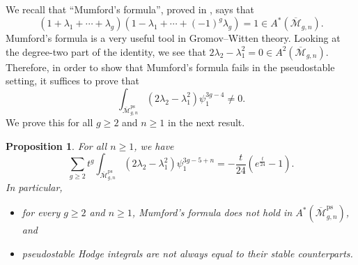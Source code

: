 \documentclass[12pt]{amsart}
\newtheorem{proposition}[equation]{Proposition}
\theoremstyle{definition}
\newcommand{\M}{\overline{\mathcal{M}}}
\newcommand{\ps}{\mathrm{ps}}
\numberwithin{equation}{section}
\begin{document}
We recall that ``Mumford's formula'', proved in \cite{Mumford}, says that
\[
(1+\lambda_1+\cdots+\lambda_g)(1-\lambda_1+\cdots+(-1)^g\lambda_g)=1\in A^*(\M_{g,n}).
\]
Mumford's formula is a very useful tool in Gromov--Witten theory. Looking at the degree-two part of the identity, we see that $2\lambda_2-\lambda_1^2=0\in A^2(\M_{g,n})$. Therefore, in order to show that Mumford's formula fails in the pseudostable setting, it suffices to prove that
\[
\int_{\M_{g,n}^{\ps}}(2\lambda_2-\lambda_1^2)\psi_1^{3g-4}\neq 0.
\]
We prove this for all $g\geq 2$ and $n\geq 1$ in the next result.

\begin{proposition}\label{thm:mumford}
For all $n\geq 1$, we have
\[
\sum_{g\geq 2}t^g\int_{\M_{g,n}^{\ps}}(2\lambda_2-\lambda_1^2)\psi_1^{3g-5+n}=-\frac{t}{24}(e^{\frac{t}{24}}-1).
\]
In particular,
\begin{itemize}
\item for every $g\geq 2$ and $n\geq 1$, Mumford's formula does not hold in $A^*(\M_{g,n}^\ps)$, and
\item pseudostable Hodge integrals are not always equal to their stable counterparts.
\end{itemize}
\end{proposition}
\end{document}
